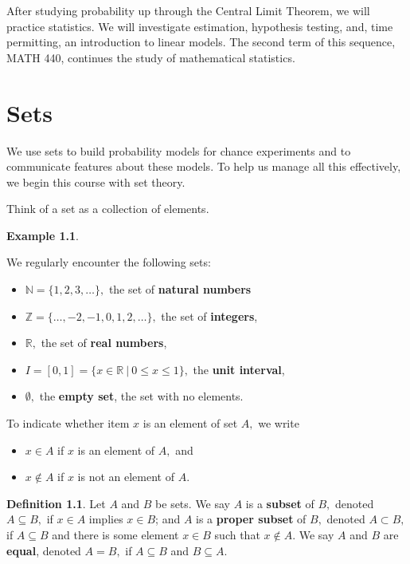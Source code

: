 \documentclass[
]{book}
\providecommand{\tightlist}{%
  \setlength{\itemsep}{0pt}\setlength{\parskip}{0pt}}
\theoremstyle{definition}
\newtheorem{definition}{Definition}[chapter]
\theoremstyle{definition}
\newtheorem{example}{Example}[chapter]
\theoremstyle{definition}
\theoremstyle{definition}
\theoremstyle{remark}
\begin{document}
After studying probability up through the Central Limit Theorem, we will practice statistics. We will investigate estimation, hypothesis testing, and, time permitting, an introduction to linear models. The second term of this sequence, MATH 440, continues the study of mathematical statistics.

\chapter{Sets}\label{sets}

We use sets to build probability models for chance experiments and to communicate features about these models. To help us manage all this effectively, we begin this course with set theory.

Think of a set as a collection of elements.

\begin{example}
\protect\hypertarget{exm:common-sets}{}\label{exm:common-sets}

We regularly encounter the following sets:

\begin{itemize}
\tightlist
\item
  \(\mathbb{N} = \{1, 2, 3, \ldots \},\) the set of \textbf{natural numbers}
\item
  \(\mathbb{Z} = \{\ldots,-2, -1, 0, 1, 2, \ldots \},\) the set of \textbf{integers},
\item
  \(\mathbb{R},\) the set of \textbf{real numbers},
\item
  \(I = [0,1] = \{x \in \mathbb{R}~|~0 \leq x \leq 1\},\) the \textbf{unit interval},
\item
  \(\emptyset,\) the \textbf{empty set}, the set with no elements.
\end{itemize}

\end{example}

To indicate whether item \(x\) is an element of set \(A,\) we write

\begin{itemize}
\tightlist
\item
  \(x \in A\) if \(x\) is an element of \(A,\) and
\item
  \(x \notin A\) if \(x\) is not an element of \(A\).
\end{itemize}

\begin{definition}
\protect\hypertarget{def:subset}{}\label{def:subset}Let \(A\) and \(B\) be sets.
We say \(A\) is a \textbf{subset} of \(B,\) denoted \(A \subseteq B,\) if \(x \in A\) implies \(x \in B\); and \(A\) is a \textbf{proper subset} of \(B,\) denoted \(A \subset B,\) if \(A \subseteq B\) and there is some element \(x \in B\) such that \(x \notin A\). We say \(A\) and \(B\) are \textbf{equal}, denoted \(A = B,\) if \(A \subseteq B\) and \(B \subseteq A\).
\end{definition}
\end{document}
